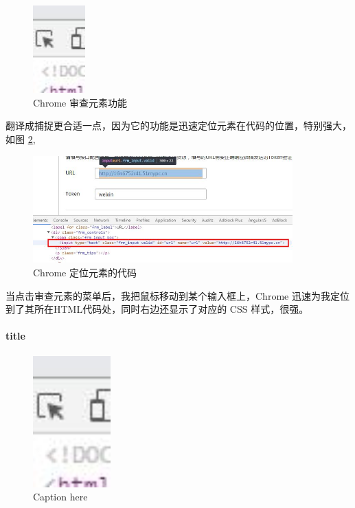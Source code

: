 \documentclass[UTF8]{ctexbook}
\begin{document}
{{\begin{figure}[H]
                  \includegraphics[width=2cm]{./img/cr_inspect.jpg}
                  \caption{Chrome 审查元素功能}
                  \label{fig:cr_inspect}
                \end{figure}
                翻译成捕捉更合适一点，因为它的功能是迅速定位元素在代码的位置，特别强大，如图 \ref{fig:cr_inspect1},
                \begin{figure}[H]
                  \centering
                  \includegraphics[width=10cm]{./img/cr_inspect1.jpg}
                  \caption{Chrome 定位元素的代码}
                  \label{fig:cr_inspect1}
                \end{figure}
                当点击审查元素的菜单后，我把鼠标移动到某个输入框上，Chrome 迅速为我定位到了其所在HTML代码处，同时右边还显示了对应的 CSS 样式，很强。
                \paragraph{title}
                \begin{figure}[H]
                  \centering
                  \includegraphics[width=3cm]{./img/cr_inspect.jpg}
                  \caption{Caption here}
                  \label{fig:figure1}
                \end{figure}

}}
\end{document}
